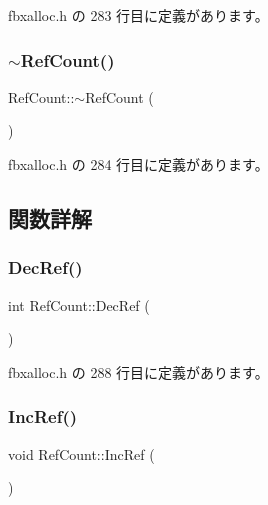  fbxalloc.\+h の 283 行目に定義があります。

\mbox{\label{class_ref_count_afa3ff3bce8a9dc9e34ef9c55496c084b}} 
\subsubsection{\texorpdfstring{$\sim$\+Ref\+Count()}{~RefCount()}}
{\footnotesize\ttfamily Ref\+Count\+::$\sim$\+Ref\+Count (\begin{DoxyParamCaption}{ }\end{DoxyParamCaption})\hspace{0.3cm}{\ttfamily [inline]}}



 fbxalloc.\+h の 284 行目に定義があります。



\subsection{関数詳解}
\mbox{\label{class_ref_count_a714d52936fdaf707bfc1741942569295}} 
\subsubsection{\texorpdfstring{Dec\+Ref()}{DecRef()}}
{\footnotesize\ttfamily int Ref\+Count\+::\+Dec\+Ref (\begin{DoxyParamCaption}{ }\end{DoxyParamCaption})\hspace{0.3cm}{\ttfamily [inline]}}



 fbxalloc.\+h の 288 行目に定義があります。

\mbox{\label{class_ref_count_abbe1d06e3becee3f3ae61c8d03498a7f}} 
\subsubsection{\texorpdfstring{Inc\+Ref()}{IncRef()}}
{\footnotesize\ttfamily void Ref\+Count\+::\+Inc\+Ref (\begin{DoxyParamCaption}{ }\end{DoxyParamCaption})\hspace{0.3cm}{\ttfamily [inline]}}



